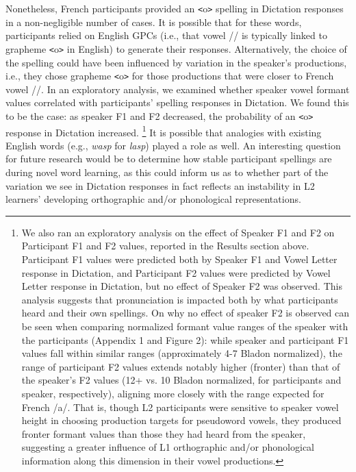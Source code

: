 \documentclass[
  english,
  man,floatsintext]{apa7}
\begin{document}
Nonetheless, French participants provided an \texttt{\textless{}}o\texttt{\textgreater{}} spelling in Dictation responses in a non-negligible number of cases. It is possible that for these words, participants relied on English GPCs (i.e., that vowel /\textscripta / is typically linked to grapheme \texttt{\textless{}}o\texttt{\textgreater{}} in English) to generate their responses. Alternatively, the choice of the spelling could have been influenced by variation in the speaker's productions, i.e., they chose grapheme \texttt{\textless{}}o\texttt{\textgreater{}} for those productions that were closer to French vowel /\textopeno /. In an exploratory analysis, we examined whether speaker vowel formant values correlated with participants' spelling responses in Dictation. We found this to be the case: as speaker F1 and F2 decreased, the probability of an \texttt{\textless{}}o\texttt{\textgreater{}} response in Dictation increased. \footnote{We also ran an exploratory analysis on the effect of Speaker F1 and F2 on Participant F1 and F2 values, reported in the Results section above. Participant F1 values were predicted both by Speaker F1 and Vowel Letter response in Dictation, and Participant F2 values were predicted by Vowel Letter response in Dictation, but no effect of Speaker F2 was observed. This analysis suggests that pronunciation is impacted both by what participants heard and their own spellings. On why no effect of speaker F2 is observed can be seen when comparing normalized formant value ranges of the speaker with the participants (Appendix 1 and Figure 2): while speaker and participant F1 values fall within similar ranges (approximately 4-7 Bladon normalized), the range of participant F2 values extends notably higher (fronter) than that of the speaker's F2 values (12+ vs. 10 Bladon normalized, for participants and speaker, respectively), aligning more closely with the range expected for French /a/. That is, though L2 participants were sensitive to speaker vowel height in choosing production targets for pseudoword vowels, they produced fronter formant values than those they had heard from the speaker, suggesting a greater influence of L1 orthographic and/or phonological information along this dimension in their vowel productions.} It is possible that analogies with existing English words (e.g., \emph{wasp} for \emph{lasp}) played a role as well. An interesting question for future research would be to determine how stable participant spellings are during novel word learning, as this could inform us as to whether part of the variation we see in Dictation responses in fact reflects an instability in L2 learners' developing orthographic and/or phonological representations.
\end{document}

